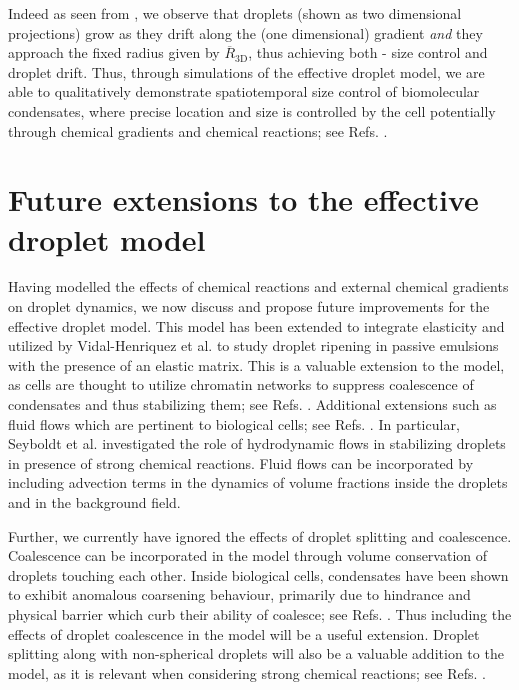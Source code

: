 Indeed as seen from , we observe that droplets (shown as two dimensional projections) grow as they drift along the (one dimensional) gradient \textit{and} they approach the fixed radius given by $\overline{R}_\mathrm{3D}$, thus achieving both - size control and droplet drift.
Thus, through simulations of the effective droplet model, we are able to qualitatively demonstrate spatiotemporal size control of biomolecular condensates, where precise location and size is controlled by the cell potentially through chemical gradients and chemical reactions; see Refs. \cite{Brangwynne2009,Brangwynne2013}.

\section{Future extensions to the effective droplet model}

Having modelled the effects of chemical reactions and external chemical gradients on droplet dynamics, we now discuss and propose future improvements for the effective droplet model.
This model has been extended to integrate elasticity and utilized by Vidal-Henriquez et al. \cite{VidalHenriquez2021,Vidal2020} to study droplet ripening in passive emulsions with the presence of an elastic matrix.
This is a valuable extension to the model, as cells are thought to utilize chromatin networks to suppress coalescence of condensates and thus stabilizing them; see Refs. \cite{Feric2013,Wiegand2020,Boeddeker2022}.
Additional extensions such as fluid flows which are pertinent to biological cells; see Refs. \cite{Brangwynne2009,Setru2021,Brangwynne2011}.
In particular, Seyboldt et al. \cite{Seyboldt_2018} investigated the role of hydrodynamic flows in stabilizing droplets in presence of strong chemical reactions.
Fluid flows can be incorporated by including advection terms in the dynamics of volume fractions inside the droplets and in the background field.

Further, we currently have ignored the effects of droplet splitting and coalescence.
Coalescence can be incorporated in the model through volume conservation of droplets touching each other.
Inside biological cells, condensates have been shown to exhibit anomalous coarsening behaviour, primarily due to hindrance and physical barrier which curb their ability of coalesce; see Refs. \cite{Feric2013,Quiroz2020,Boeddeker2022,Lee2021}.
Thus including the effects of droplet coalescence in the model will be a useful extension.
Droplet splitting along with non-spherical droplets will also be a valuable addition to the model, as it is relevant when considering strong chemical reactions; see Refs. \cite{Zwicker_nature_2016,Seyboldt_2018}.

